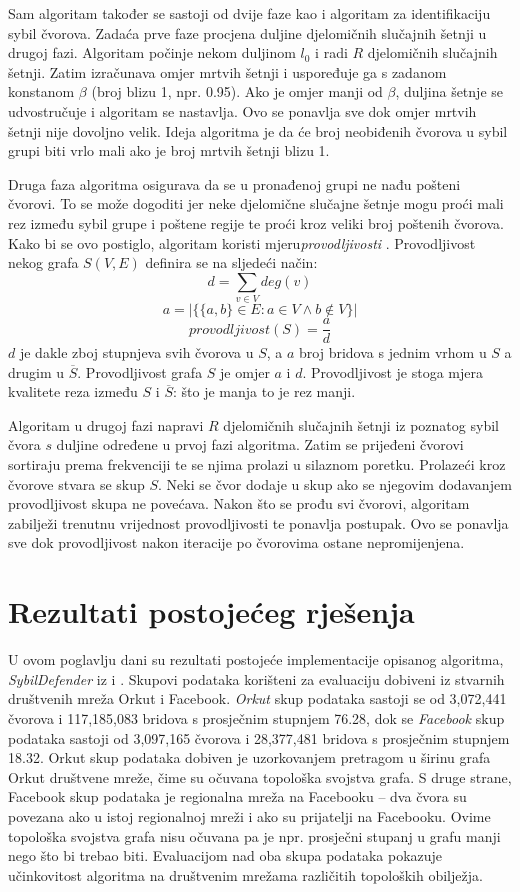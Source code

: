 \documentclass[times, utf8, seminar, numeric]{fer}
\begin{document}
Sam algoritam također se sastoji od dvije faze kao i algoritam za identifikaciju sybil čvorova. Zadaća prve faze procjena duljine djelomičnih slučajnih šetnji u drugoj fazi. Algoritam počinje nekom duljinom $l_0$ i radi $R$ djelomičnih slučajnih šetnji. Zatim izračunava omjer mrtvih šetnji i uspoređuje ga s zadanom konstanom $\beta$ (broj blizu 1, npr. 0.95). Ako je omjer manji od $\beta$, duljina šetnje se udvostručuje i algoritam se nastavlja. Ovo se ponavlja sve dok omjer mrtvih šetnji nije dovoljno velik. Ideja algoritma je da će broj neobiđenih čvorova u sybil grupi biti vrlo mali ako je broj mrtvih šetnji blizu 1.

Druga faza algoritma osigurava da se u pronađenoj grupi ne nađu pošteni čvorovi. To se može dogoditi jer neke djelomične slučajne šetnje mogu proći mali rez između sybil grupe i poštene regije te proći kroz veliki broj poštenih čvorova. Kako bi se ovo postiglo, algoritam koristi mjeru\textit{provodljivosti} . Provodljivost nekog grafa $S(V, E)$ definira se na sljedeći način:
\[ d = \sum_{v \in V} deg(v) \]
\[ a = |\{\{a, b\} \in E : a \in V \land b \notin V\}| \]
\[ provodljivost(S) = \frac{a}{d} \]
$d$ je dakle zboj stupnjeva svih čvorova u $S$, a $a$ broj bridova s jednim vrhom u $S$ a drugim u $\overline{S}$. Provodljivost grafa $S$ je omjer $a$ i $d$. Provodljivost je stoga mjera kvalitete reza između $S$ i $\overline{S}$: što je manja to je rez manji.

Algoritam u drugoj fazi napravi $R$ djelomičnih slučajnih šetnji iz poznatog sybil čvora $s$ duljine određene u prvoj fazi algoritma. Zatim se prijeđeni čvorovi sortiraju prema frekvenciji te se njima prolazi u silaznom poretku. Prolazeći kroz čvorove stvara se skup $S$. Neki se čvor dodaje u skup ako se njegovim dodavanjem provodljivost skupa ne povećava. Nakon što se prođu svi čvorovi, algoritam zabilježi trenutnu vrijednost provodljivosti te ponavlja postupak. Ovo se ponavlja sve dok provodljivost nakon iteracije po čvorovima ostane nepromijenjena.

\chapter{Rezultati postojećeg rješenja} \label{ch:results}
U ovom poglavlju dani su rezultati postojeće implementacije opisanog algoritma, \textit{SybilDefender} iz \cite{sybil-defender-old} i \cite{sybil-defender}. Skupovi podataka korišteni za evaluaciju dobiveni iz stvarnih društvenih mreža Orkut i Facebook. \textit{Orkut} skup podataka sastoji se od 3,072,441 čvorova i 117,185,083 bridova s prosječnim stupnjem 76.28, dok se \textit{Facebook} skup podataka sastoji od 3,097,165 čvorova i 28,377,481 bridova s prosječnim stupnjem 18.32. Orkut skup podataka dobiven je uzorkovanjem pretragom u širinu grafa Orkut društvene mreže, čime su očuvana topološka svojstva grafa. S druge strane, Facebook skup podataka je regionalna mreža na Facebooku -- dva čvora su povezana ako u istoj regionalnoj mreži i ako su prijatelji na Facebooku. Ovime topološka svojstva grafa nisu očuvana pa je npr. prosječni stupanj u grafu manji nego što bi trebao biti. Evaluacijom nad oba skupa podataka pokazuje učinkovitost algoritma na društvenim mrežama različitih topoloških obilježja.
\end{document}
